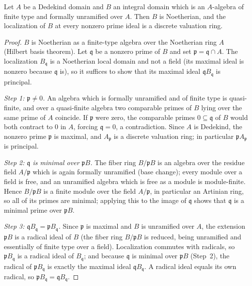 \begin{theorem}
  \label{pa-thm:unramified_finiteType_dedekind_dvr}
  \leanok

  Let \(A\) be a Dedekind domain and \(B\) an integral domain which is an \(A\)-algebra of
  finite type and formally unramified over \(A\). Then \(B\) is Noetherian, and the
  localization of \(B\) at every nonzero prime ideal is a discrete valuation ring.
\end{theorem}
\begin{proof}
  \leanok
  \(B\) is Noetherian as a finite-type algebra over the Noetherian ring \(A\) (Hilbert basis
  theorem). Let \(\mathfrak q\) be a nonzero prime of \(B\) and set
  \(\mathfrak p = \mathfrak q \cap A\). The localization \(B_{\mathfrak q}\) is a Noetherian
  local domain and not a field (its maximal ideal is nonzero because \(\mathfrak q\) is), so
  it suffices to show that its maximal ideal \(\mathfrak q B_{\mathfrak q}\) is principal.

  \emph{Step 1: \(\mathfrak p \neq 0\).} An algebra which is formally unramified and of
  finite type is quasi-finite, and over a quasi-finite algebra two comparable primes of
  \(B\) lying over the same prime of \(A\) coincide. If \(\mathfrak p\) were zero, the
  comparable primes \(0 \subseteq \mathfrak q\) of \(B\) would both contract to \(0\) in
  \(A\), forcing \(\mathfrak q = 0\), a contradiction. Since \(A\) is Dedekind, the nonzero
  prime \(\mathfrak p\) is maximal, and \(A_{\mathfrak p}\) is a discrete valuation ring; in
  particular \(\mathfrak p A_{\mathfrak p}\) is principal.

  \emph{Step 2: \(\mathfrak q\) is minimal over \(\mathfrak p B\).} The fiber ring
  \(B/\mathfrak p B\) is an algebra over the residue field \(A/\mathfrak p\) which is again
  formally unramified (base change); every module over a field is free, and an unramified
  algebra which is free as a module is module-finite. Hence \(B/\mathfrak p B\) is a finite
  module over the field \(A/\mathfrak p\), in particular an Artinian ring, so all of its
  primes are minimal; applying this to the image of \(\mathfrak q\) shows that
  \(\mathfrak q\) is a minimal prime over \(\mathfrak p B\).

  \emph{Step 3: \(\mathfrak q B_{\mathfrak q} = \mathfrak p B_{\mathfrak q}\).} Since
  \(\mathfrak p\) is maximal and \(B\) is unramified over \(A\), the extension
  \(\mathfrak p B\) is a radical ideal of \(B\) (the fiber ring \(B/\mathfrak p B\) is
  reduced, being unramified and essentially of finite type over a field). Localization
  commutes with radicals, so \(\mathfrak p B_{\mathfrak q}\) is a radical ideal of
  \(B_{\mathfrak q}\); and because \(\mathfrak q\) is minimal over \(\mathfrak p B\)
  (Step~2), the radical of \(\mathfrak p B_{\mathfrak q}\) is exactly the maximal ideal
  \(\mathfrak q B_{\mathfrak q}\). A radical ideal equals its own radical, so
  \(\mathfrak p B_{\mathfrak q} = \mathfrak q B_{\mathfrak q}\).


\end{proof}
